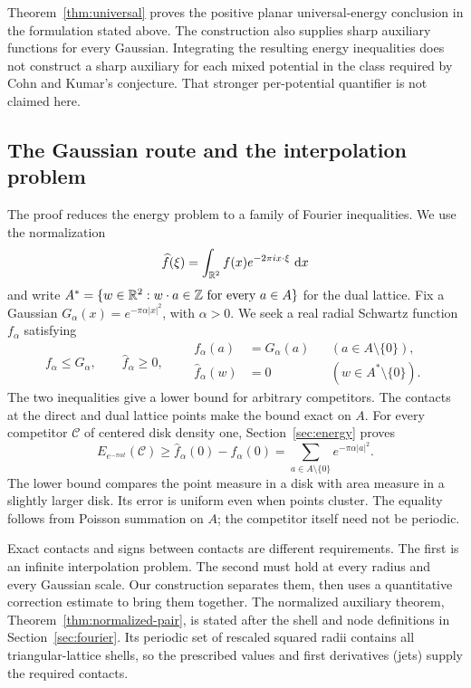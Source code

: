 Theorem~\ref{thm:universal} proves the positive planar universal-energy
conclusion in the formulation stated above.  The construction also supplies
sharp auxiliary functions for every Gaussian.  Integrating the resulting
energy inequalities does not construct a sharp auxiliary for each mixed
potential in the class required by Cohn and Kumar's conjecture.  That
stronger per-potential quantifier is not claimed here.

\subsection{The Gaussian route and the interpolation problem}

The proof reduces the energy problem to a family of Fourier inequalities.
We use the normalization
\[
 \widehat f(\xi)=\int_{\mathbb R^2}f(x)e^{-2\pi i x\cdot\xi}\,\mathop{}\!\mathrm d x
\]
and write
$A^*=\{w\in\mathbb R^2:w\cdot a\in\mathbb Z\text{ for every }a\in A\}$
for the dual lattice.  Fix a Gaussian
$G_\alpha(x)=e^{-\pi\alpha|x|^2}$, with $\alpha>0$.
We seek a real radial Schwartz function $f_\alpha$ satisfying
\[
 f_\alpha\le G_\alpha,\qquad \widehat f_\alpha\ge0,
 \qquad
 \begin{aligned}
 f_\alpha(a)&=G_\alpha(a)&& (a\in A\setminus\{0\}),\\
 \widehat f_\alpha(w)&=0&& (w\in A^*\setminus\{0\}).
 \end{aligned}
\]
The two inequalities give a lower bound for arbitrary competitors.  The
contacts at the direct and dual lattice points make the bound exact on $A$.
For every competitor $\mathcal C$ of centered disk density one,
Section~\ref{sec:energy} proves
\[
 E_{e^{-\pi\alpha t}}(\mathcal C)
 \ge\widehat f_\alpha(0)-f_\alpha(0)
 =\sum_{a\in A\setminus\{0\}}e^{-\pi\alpha|a|^2}.
\]
The lower bound compares the point measure in a disk with area measure in
a slightly larger disk.  Its error is uniform even when points cluster.
The equality follows from Poisson summation on $A$; the competitor itself
need not be periodic.

Exact contacts and signs between contacts are different requirements.  The
first is an infinite interpolation problem.  The second must hold at every
radius and every Gaussian scale.  Our construction separates them, then
uses a quantitative correction estimate to bring them together.
The normalized auxiliary theorem, Theorem~\ref{thm:normalized-pair}, is
stated after the shell and node definitions in Section~\ref{sec:fourier}.
Its periodic set of rescaled squared radii contains all triangular-lattice
shells, so the prescribed values and first derivatives (jets) supply the
required contacts.

